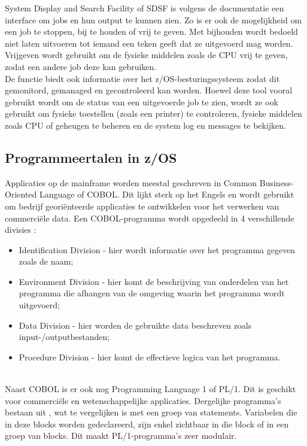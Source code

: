 System Display and Search Facility of SDSF is volgens de \textcite{IBM2023} documentatie een interface om jobs en hun output te kunnen zien. Zo is er ook de mogelijkheid om een job te stoppen, bij te houden of vrij te geven. Met bijhouden wordt bedoeld niet laten uitvoeren tot iemand een teken geeft dat ze uitgevoerd mag worden. Vrijgeven wordt gebruikt om de fysieke middelen zoals de CPU vrij te geven, zodat een andere job deze kan gebruiken. \\ 
De functie biedt ook informatie over het z/OS-besturingssysteem zodat dit gemonitord, gemanaged en gecontroleerd kan worden. Hoewel deze tool vooral gebruikt wordt om de status van een uitgevoerde job te zien, wordt ze ook gebruikt om fysieke toestellen (zoals een printer) te controleren, fysieke middelen zoals CPU of geheugen te beheren en de system log en messages te bekijken.

\subsection{Programmeertalen in z/OS}
Applicaties op de mainframe worden meestal geschreven in Common Business-Oriented Language of COBOL. Dit lijkt sterk op het Engels en wordt gebruikt om bedrijf georiënteerde applicaties te ontwikkelen voor het verwerken van commerciële data. Een COBOL-programma wordt opgedeeld in 4 verschillende divisies \autocite{IBMc}:
\begin{itemize}
    \item Identification Division - hier wordt informatie over het programma gegeven zoals de naam;
    \item Environment Division - hier komt de beschrijving van onderdelen van het programma die afhangen van de omgeving waarin het programma wordt uitgevoerd;
    \item Data Division - hier worden de gebruikte data beschreven zoals input-/outputbestanden;
    \item Procedure Division - hier komt de effectieve logica van het programma.
\end{itemize} \\

Naast COBOL is er ook nog Programming Language 1 of PL/1. Dit is geschikt voor commerciële en wetenschappelijke applicaties. Dergelijke programma's bestaan uit , wat te vergelijken is met een groep van statements. Variabelen die in deze blocks worden gedeclareerd, zijn enkel zichtbaar in die block of in een groep van blocks. Dit maakt PL/1-programma's zeer modulair. \autocite{IBMc}

